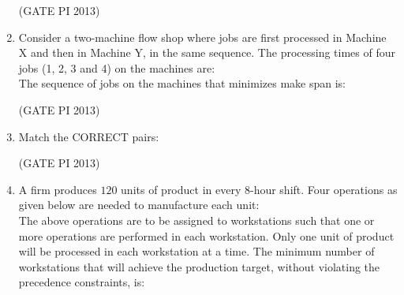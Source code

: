 \documentclass[journal,12pt,onecolumn]{IEEEtran}
\theoremstyle{remark}
\begin{document}
\begin{enumerate}
\hfill (GATE PI 2013)

\item Consider a two\--machine flow shop where jobs are first processed in Machine X and then in Machine Y, in the same sequence.  
The processing times of four jobs (1, 2, 3 and 4) on the machines are:   \\

The sequence of jobs on the machines that minimizes make span is:
\begin{enumerate}
\end{enumerate}

\hfill (GATE PI 2013)


\item Match the CORRECT pairs:  
 

\begin{enumerate}
\end{enumerate}

\hfill (GATE PI 2013)

\item A firm produces $120$ units of product in every $8$\--hour shift. Four operations as given below are needed to manufacture each unit: \\

 

The above operations are to be assigned to workstations such that one or more operations are performed in each workstation.  
Only one unit of product will be processed in each workstation at a time.  
The minimum number of workstations that will achieve the production target, without violating the precedence constraints, is:
\begin{enumerate}
\end{enumerate}


\end{enumerate}
\end{document}
